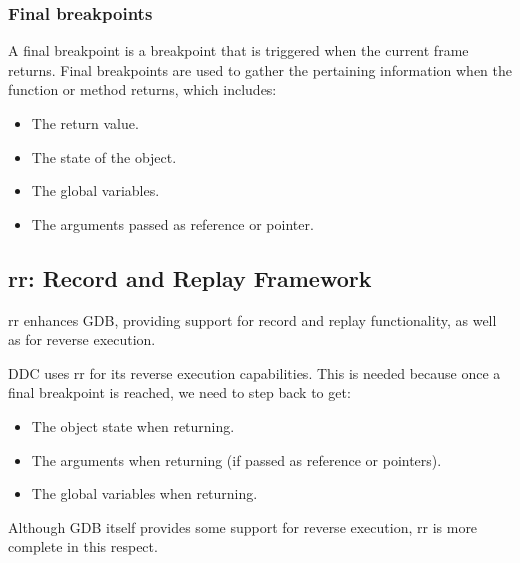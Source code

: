\subsubsection{Final breakpoints}
A final breakpoint is a breakpoint that is triggered when the current frame returns. Final breakpoints are used to gather the pertaining information when the function or method returns, which includes:
\begin{itemize}
    \item The return value.
    \item The state of the object.
    \item The global variables.
    \item The arguments passed as reference or pointer.
\end{itemize}

\subsection{rr: Record and Replay Framework}

rr \cite{rr} enhances GDB, providing support for record and replay functionality, as well as for reverse execution.

DDC uses rr for its reverse execution capabilities. This is needed because once a final breakpoint is reached, we need to step back to get:
\begin{itemize}
    \item The object state when returning.
    \item The arguments when returning (if passed as reference or pointers).
    \item The global variables when returning.
\end{itemize}
Although GDB itself provides some support for reverse execution, rr is more complete in this respect.
